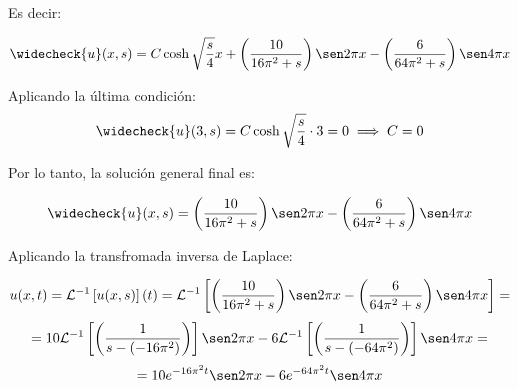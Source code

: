 \begin{solution}
Es decir: 

$$\widecheck{u}(x,s)=C\cosh{\sqrt{\frac{s}{4}}x}+\left(\frac{10}{16\pi^2 +s}\right)\sen2\pi x-\left(\frac{6}{64\pi^2 +s}\right)\sen4\pi x$$

Aplicando la última condición: 
$$\widecheck{u}(3,s)=C\cosh{\sqrt{\frac{s}{4}}\cdot3}=0\implies C=0$$

Por lo tanto, la solución general final es: 

$$\widecheck{u}(x,s)=\left(\frac{10}{16\pi^2 +s}\right)\sen2\pi x-\left(\frac{6}{64\pi^2 +s}\right)\sen4\pi x$$

Aplicando la transfromada inversa de Laplace:

$$u(x,t)=\iLaplace{u(x,s)}(t)=\iLaplace{\left(\frac{10}{16\pi^2 +s}\right)\sen2\pi x-\left(\frac{6}{64\pi^2 +s}\right)\sen4\pi x}=$$
$$=10\iLaplace{\left(\frac{1}{s-(-16\pi^2) }\right)}\sen2\pi x-6\iLaplace{\left(\frac{1}{s-(-64\pi^2) }\right)}\sen4\pi x=$$
$$=10e^{-16\pi^2t}\sen2\pi x-6e^{-64\pi^2t}\sen4\pi x $$




\end{solution}